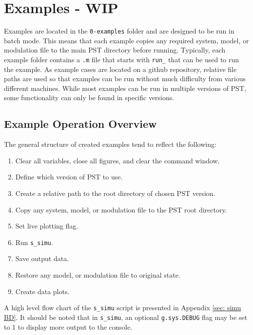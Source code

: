 \chapter{Examples - WIP}
Examples are located in the \verb|0-examples| folder and are designed to be run in batch mode.
This means that each example copies any required system, model, or modulation file to the main PST directory before running.
Typically, each example folder contains a \verb|.m| file that starts with \verb|run_| that can be used to run the example.
As example cases are located on a github repository, relative file paths are used so that examples can be run without much difficulty from various different machines.
While most examples can be run in multiple versions of PST, some functionality can only be found in specific versions.


\section{Example Operation Overview}

\noindent The general structure of created examples tend to reflect the following:
\begin{enumerate}
\itemsep 0em
\item Clear all variables, close all figures, and clear the command window.
\item Define which version of PST to use.
\item Create a relative path to the root directory of chosen PST version.
\item Copy any system, model, or modulation file to the PST root directory.
\item Set live plotting flag.
\item Run \verb|s_simu|.
\item Save output data.
\item Restore any model, or modulation file to original state.
\item Create data plots.
\end{enumerate}

A high level flow chart of the \verb|s_simu| script is presented in Appendix \ref{sec: simu BD}.
It should be noted that in \verb|s_simu|, an optional \verb|g.sys.DEBUG| flag may be set to 1 to display more output to the console.



